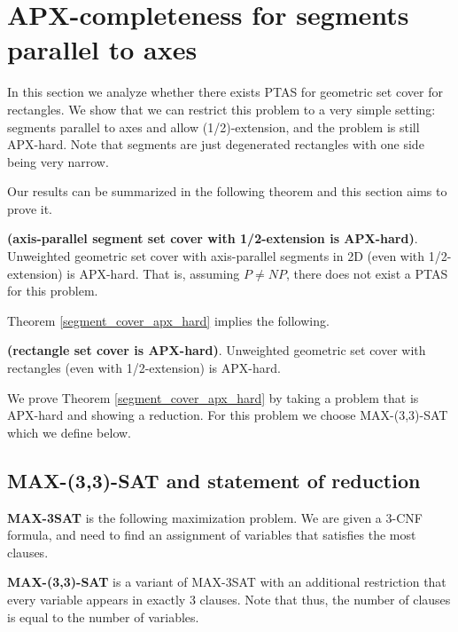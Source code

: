 \section{APX-completeness for segments parallel to axes}
\label{section:segment_apx}

In this section we analyze whether there exists 
PTAS for geometric set cover for rectangles.
We show that we can restrict this problem
to a very simple setting:
segments parallel to axes and allow (1/2)-extension,
and the problem is still APX-hard.
Note that segments are just degenerated rectangles
with one side being very narrow.


Our results can be summarized in the following
theorem and this section aims to prove it.

\begin{tw}{
\label{segment_cover_apx_hard}
	\textbf{(axis-parallel segment set cover with 1/2-extension is APX-hard)}.	
	Unweighted geometric set cover
	with axis-parallel segments in 2D (even with 1/2-extension)
	is APX-hard.
	That is, assuming $P\neq NP$, there does not exist a PTAS
	for this problem.
}\end{tw}
 
Theorem \ref{segment_cover_apx_hard} implies the following.

\begin{corollary}{
\label{rectangle_cover_apx_hard}
	\textbf{(rectangle set cover is APX-hard)}.	
	Unweighted geometric set cover
	with rectangles (even with 1/2-extension) is APX-hard.
}\end{corollary}


We prove Theorem \ref{segment_cover_apx_hard}
by taking a problem that is APX-hard
and showing a reduction.
For this problem we choose
MAX-(3,3)-SAT which we define below.


\subsection{MAX-(3,3)-SAT and statement of reduction}
\begin{defi}
\textbf{MAX-3SAT} is the following maximization problem. We are given a 3-CNF
formula, and need to find an assignment of variables
that satisfies the most clauses.
\end{defi}

\begin{defi}
\textbf{MAX-(3,3)-SAT} is a variant of MAX-3SAT with an additional
restriction that every variable appears in exactly 3 clauses.
Note that thus, the number of clauses is equal to the number of variables.
\end{defi}

